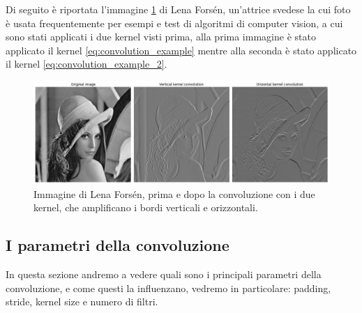 Di seguito è riportata l'immagine \ref{fig:lena} di Lena Forsén, un'attrice svedese la cui foto è usata frequentemente per esempi e test di algoritmi di 
computer vision, a cui sono stati applicati i due kernel visti prima, alla prima immagine è stato applicato il kernel \ref{eq:convolution_example} mentre alla seconda
è stato applicato il kernel \ref{eq:convolution_example_2}.

    \begin{figure}[H]
        \centering
        \includegraphics[width=1.0\textwidth]{imgs/lenna_convolution.png}
        \caption{Immagine di Lena Forsén, prima e dopo la convoluzione con i due kernel, che amplificano i bordi verticali e orizzontali.}
        \label{fig:lena}
    \end{figure}

\subsection{I parametri della convoluzione}

In questa sezione andremo a vedere quali sono i principali parametri della convoluzione, e come questi la influenzano, vedremo in particolare: 
padding, stride, kernel size e numero di filtri.

